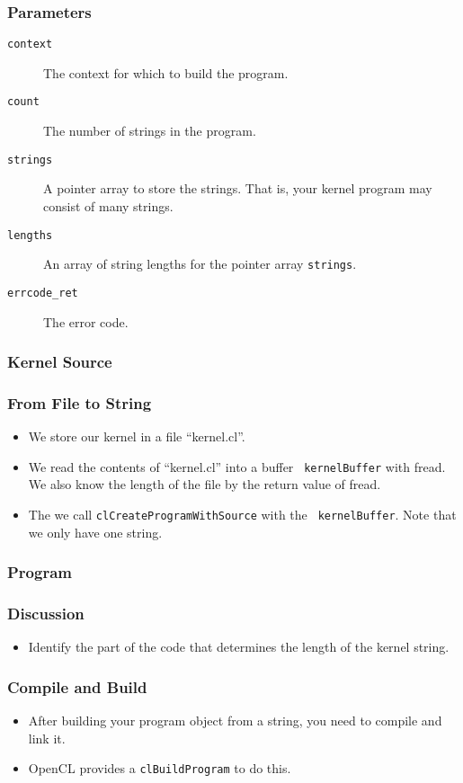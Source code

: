 \documentclass{beamer}
\begin{document}
\begin{frame}
  \frametitle{Parameters}
  \begin{description}
  \item [\tt context] The context for which to build the program.
  \item [\tt count] The number of strings in the program.
  \item [\tt strings] A pointer array to store the strings.  That is,
    your kernel program may consist of many strings.
  \item [\tt lengths] An array of string lengths for the pointer array
    {\tt strings}.
  \item [\tt errcode\_ret] The error code.
  \end{description}
\end{frame}

\begin{frame}
  \frametitle{Kernel Source}
\end{frame}

\begin{frame}
  \frametitle{From File to String}
  \begin{itemize}
  \item We store our kernel in a file ``kernel.cl''.
  \item We read the contents of ``kernel.cl'' into a buffer {\tt
    kernelBuffer} with fread.  We also know the length of the file
    by the return value of fread.
  \item The we call {\tt clCreateProgramWithSource} with the {\tt
    kernelBuffer}.  Note that we only have one string.
  \end{itemize}
\end{frame}

\begin{frame}
  \frametitle{Program}
  \centerline{}
\end{frame}

\begin{frame}
  \frametitle{Discussion}
  \begin{itemize}
  \item Identify the part of the code that determines the length of
    the kernel string.
  \end{itemize}
\end{frame}

\begin{frame}
  \frametitle{Compile and Build}
  \begin{itemize}
  \item After building your program object from a string, you need to
    compile and link it.
  \item OpenCL provides a {\tt clBuildProgram} to do this.
  \end{itemize}
\end{frame}
\end{document}
